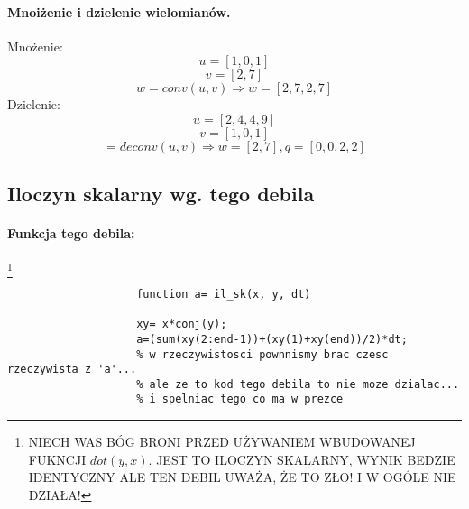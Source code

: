 \documentclass[16pt]{article}
\begin{document}
        \paragraph*{Mnoiżenie i dzielenie wielomianów.\\}
            Mnożenie:
            \begin{equation*}
                u= [1, 0, 1]
            \end{equation*}
            \begin{equation*}
                v= [2, 7]
            \end{equation*}
            \begin{equation*}
                w= conv(u, v)
                \Rightarrow
                w= [2, 7, 2, 7]
            \end{equation*}
            Dzielenie:
            \begin{equation*}
                u= [2, 4, 4, 9]
            \end{equation*}
            \begin{equation*}
                v= [1, 0, 1]
            \end{equation*}
            \begin{equation*}
                [w, r]= deconv(u, v)
                \Rightarrow
                w= [2, 7], q= [0, 0, 2, 2]
            \end{equation*}

            \subsection*{Iloczyn skalarny wg. tego debila}
                \paragraph*{Funkcja tego debila:} \footnote{NIECH WAS BÓG BRONI PRZED UŻYWANIEM WBUDOWANEJ FUKNCJI $dot(y, x)$. JEST TO ILOCZYN SKALARNY, WYNIK BEDZIE IDENTYCZNY ALE TEN DEBIL UWAŻA, ŻE TO ZŁO! I W OGÓLE NIE DZIAŁA!}
                \begin{lstlisting}
                    function a= il_sk(x, y, dt)

                    xy= x*conj(y);
                    a=(sum(xy(2:end-1))+(xy(1)+xy(end))/2)*dt;
                    % w rzeczywistosci pownnismy brac czesc rzeczywista z 'a'...
                    % ale ze to kod tego debila to nie moze dzialac...
                    % i spelniac tego co ma w prezce
                \end{lstlisting}
\end{document}
